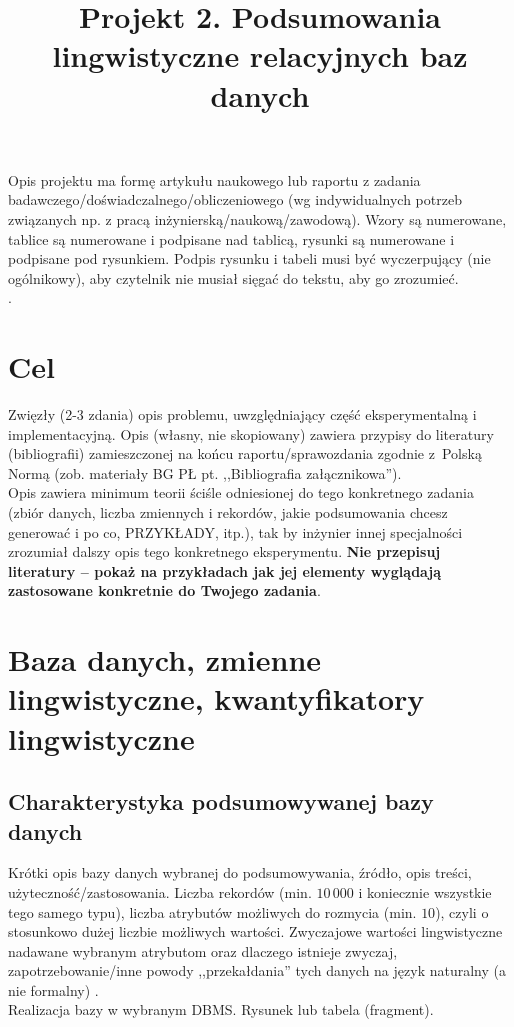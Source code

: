 \documentclass{classrep}
\author{
  \studentinfo{Autor Pierwszy}{nr albumu 1} \and
  \studentinfo{Autor Drugi}{nr albumu 2} }
\title{Projekt 2.  Podsumowania lingwistyczne relacyjnych baz danych}
\begin{document}
\maketitle

Opis projektu ma formę artykułu naukowego lub raportu z zadania
badawczego/doświadczalnego/obliczeniowego (wg indywidualnych potrzeb związanych np. z
pracą inżynierską/naukową/zawodową). Wzory są numerowane, tablice są numerowane i podpisane nad
tablicą, rysunki są numerowane i podpisane pod rysunkiem. Podpis rysunku i
tabeli musi być wyczerpujący (nie ogólnikowy), aby czytelnik nie musiał sięgać do tekstu, aby go zrozumieć.\\
. 

\section{Cel}
Zwięzły (2-3 zdania) opis
problemu, uwzględniający część eksperymentalną i
implementacyjną.  Opis (własny, nie skopiowany) zawiera przypisy do literatury (bibliografii) zamieszczonej na końcu raportu/sprawozdania
zgodnie z~Polską Normą (zob. materiały BG PŁ pt. ,,Bibliografia
załącznikowa'').\\ 
\indent Opis zawiera minimum teorii ściśle odniesionej do tego konkretnego zadania (zbiór
danych, liczba zmiennych i rekordów, jakie podsumowania chcesz generować i po
co, PRZYKŁADY, itp.), tak by inżynier innej specjalności zrozumiał dalszy
opis tego konkretnego eksperymentu. {\bf Nie przepisuj literatury -- pokaż na
przykładach jak
jej elementy wyglądają zastosowane konkretnie do Twojego zadania}.\\


\section{Baza danych, zmienne lingwistyczne, kwantyfikatory lingwistyczne}

\subsection{Charakterystyka podsumowywanej bazy danych}
Krótki opis bazy danych wybranej do podsumowywania, źródło, opis treści,
użyteczność/zastosowania. Liczba rekordów (min. $10\,000$ i koniecznie wszystkie tego
samego typu), liczba atrybutów możliwych do rozmycia (min. $10$), czyli o stosunkowo dużej
liczbie możliwych wartości. Zwyczajowe wartości lingwistyczne nadawane wybranym
atrybutom oraz dlaczego istnieje zwyczaj, zapotrzebowanie/inne powody
,,przekałdania'' tych danych na język
naturalny (a nie formalny) \cite{niewiadomski19, niewiadomski08}.\\
Realizacja bazy w wybranym DBMS. Rysunek lub tabela (fragment).
\end{document}
